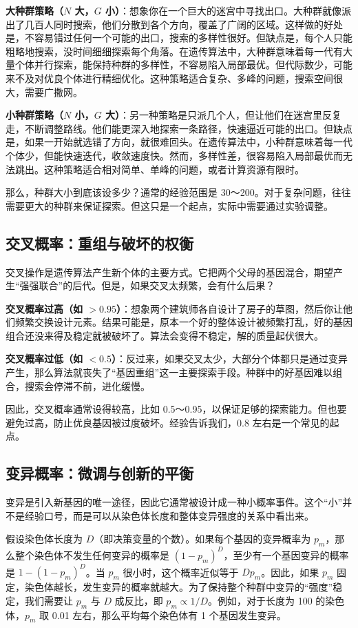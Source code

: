 \documentclass[lang=cn,zihao=-4,a4paper,fontset=windows]{beautybook}
\begin{document}
\textbf{大种群策略（$N$ 大，$G$ 小）}：想象你在一个巨大的迷宫中寻找出口。大种群就像派出了几百人同时搜索，他们分散到各个方向，覆盖了广阔的区域。这样做的好处是，不容易错过任何一个可能的出口，搜索的多样性很好。但缺点是，每个人只能粗略地搜索，没时间细细探索每个角落。在遗传算法中，大种群意味着每一代有大量个体并行探索，能保持种群的多样性，不容易陷入局部最优。但代际数少，可能来不及对优良个体进行精细优化。这种策略适合复杂、多峰的问题，搜索空间很大，需要广撒网。

\textbf{小种群策略（$N$ 小，$G$ 大）}：另一种策略是只派几个人，但让他们在迷宫里反复走，不断调整路线。他们能更深入地探索一条路径，快速逼近可能的出口。但缺点是，如果一开始就选错了方向，就很难回头。在遗传算法中，小种群意味着每一代个体少，但能快速迭代，收敛速度快。然而，多样性差，很容易陷入局部最优而无法跳出。这种策略适合相对简单、单峰的问题，或者计算资源有限时。

那么，种群大小到底该设多少？通常的经验范围是 30～200。对于复杂问题，往往需要更大的种群来保证探索。但这只是一个起点，实际中需要通过实验调整。

\subsection{交叉概率：重组与破坏的权衡}

交叉操作是遗传算法产生新个体的主要方式。它把两个父母的基因混合，期望产生“强强联合”的后代。但是，如果交叉太频繁，会有什么后果？

\textbf{交叉概率过高（如 $>0.95$）}：想象两个建筑师各自设计了房子的草图，然后你让他们频繁交换设计元素。结果可能是，原本一个好的整体设计被频繁打乱，好的基因组合还没来得及稳定就被破坏了。算法会变得不稳定，解的质量起伏很大。

\textbf{交叉概率过低（如 $<0.5$）}：反过来，如果交叉太少，大部分个体都只是通过变异产生，那么算法就丧失了“基因重组”这一主要探索手段。种群中的好基因难以组合，搜索会停滞不前，进化缓慢。

因此，交叉概率通常设得较高，比如 0.5～0.95，以保证足够的探索能力。但也要避免过高，防止优良基因被过度破坏。经验告诉我们，0.8 左右是一个常见的起点。

\subsection{变异概率：微调与创新的平衡}

变异是引入新基因的唯一途径，因此它通常被设计成一种小概率事件。这个“小”并不是经验口号，而是可以从染色体长度和整体变异强度的关系中看出来。

假设染色体长度为 $D$（即决策变量的个数）。如果每个基因的变异概率为 $p_m$，那么整个染色体不发生任何变异的概率是 $(1-p_m)^D$，至少有一个基因变异的概率是 $1-(1-p_m)^D$。当 $p_m$ 很小时，这个概率近似等于 $D p_m$。因此，如果 $p_m$ 固定，染色体越长，发生变异的概率就越大。为了保持整个种群中变异的“强度”稳定，我们需要让 $p_m$ 与 $D$ 成反比，即 $p_m \propto 1/D$。例如，对于长度为 100 的染色体，$p_m$ 取 0.01 左右，那么平均每个染色体有 1 个基因发生变异。
\end{document}
